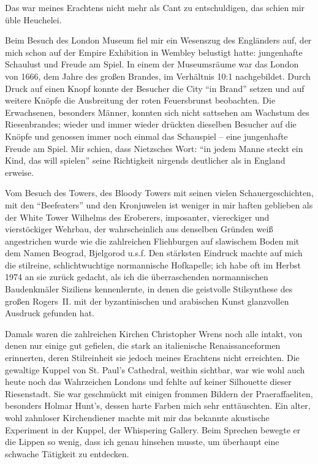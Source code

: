 \documentclass[a5paper,pagesize,10pt,twoside=true]{scrbook}
\begin{document}
Das war meines Erachtens nicht mehr als Cant zu entschuldigen, das schien mir üble Heuchelei.

Beim Besuch des London Museum fiel mir ein Wesenszug des Engländers auf, der mich schon auf der Empire Exhibition in Wembley belustigt hatte: jungenhafte Schaulust und Freude am Spiel. In einem der Museumsräume war das London von 1666, dem Jahre des großen Brandes, im Verhältnis 10:1 nachgebildet. Durch Druck auf einen Knopf konnte der Besucher die City \enquote{in Brand} setzen und auf weitere Knöpfe die Ausbreitung der roten Feuersbrunst beobachten. Die Erwachsenen, besonders Männer, konnten sich nicht sattsehen am Wachstum des Riesenbrandes; wieder und immer wieder drückten dieselben Besucher auf die Knöpfe und genossen immer noch einmal das Schauspiel -- eine jungenhafte Freude am Spiel. Mir schien, dass Nietzsches Wort: \enquote{in jedem Manne steckt ein Kind, das will spielen} seine Richtigkeit nirgends deutlicher als in England erweise.

Vom Besuch des Towers, des Bloody Towers mit seinen vielen Schauergeschichten, mit den \enquote{Beefeaters} und den Kronjuwelen ist weniger in mir haften geblieben als der White Tower Wilhelms des Eroberers, imposanter, viereckiger und vierstöckiger Wehrbau, der wahrscheinlich aus denselben Gründen weiß angestrichen wurde wie die zahlreichen Fliehburgen auf slawischem Boden mit dem Namen Beograd, Bjelgorod u.s.f. Den stärksten Eindruck machte auf mich die stilreine, schlichtwuchtige normannische Hofkapelle; ich habe oft im Herbst 1974 an sie zurück gedacht, als ich die überraschenden normannischen Baudenkmäler Siziliens kennenlernte, in denen die geistvolle Stilsynthese des großen Rogers~II. mit der byzantinischen und arabischen Kunst glanzvollen Ausdruck gefunden hat.

Damals waren die zahlreichen Kirchen Christopher Wrens noch alle intakt, von denen nur einige gut gefielen, die stark an italienische Renaissanceformen erinnerten, deren Stilreinheit sie jedoch meines Erachtens nicht erreichten. Die gewaltige Kuppel von St. Paul's Cathedral, weithin sichtbar, war wie wohl auch heute noch das Wahrzeichen Londons und fehlte auf keiner Silhouette dieser Riesenstadt. Sie war geschmückt mit einigen frommen Bildern der Praeraffaeliten, besonders Holmar Hunt's, dessen harte Farben mich sehr enttäuschten. Ein alter, wohl zahnloser Kirchendiener machte mit mir das bekannte akustische Experiment in der Kuppel, der Whispering Gallery. Beim Sprechen bewegte er die Lippen so wenig, dass ich genau hinsehen musste, um überhaupt eine schwache Tätigkeit zu entdecken.
\end{document}
